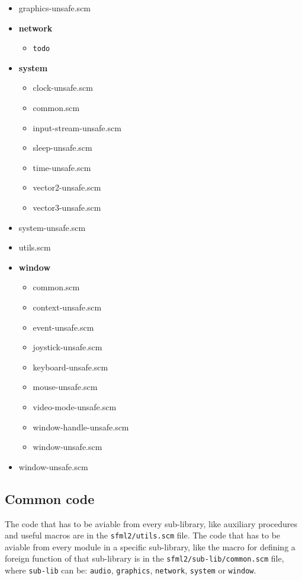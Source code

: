 \documentclass[latterpaper, leqno]{article}
\begin{document}
\begin{itemize}
\begin{itemize}
  \item graphics-unsafe.scm

  \item \textbf{network}
    \begin{itemize}
    \item \texttt{todo}
    \end{itemize}

  \item \textbf{system}
    \begin{itemize}
    \item clock-unsafe.scm
    \item common.scm
    \item input-stream-unsafe.scm
    \item sleep-unsafe.scm
    \item time-unsafe.scm
    \item vector2-unsafe.scm
    \item vector3-unsafe.scm
    \end{itemize}

  \item system-unsafe.scm

  \item utils.scm

  \item \textbf{window}
    \begin{itemize}
    \item common.scm
    \item context-unsafe.scm
    \item event-unsafe.scm
    \item joystick-unsafe.scm
    \item keyboard-unsafe.scm
    \item mouse-unsafe.scm
    \item video-mode-unsafe.scm
    \item window-handle-unsafe.scm
    \item window-unsafe.scm
    \end{itemize}

  \item window-unsafe.scm

  \end{itemize}

\end{itemize}

\subsection*{Common code}
The code that has to be aviable from every sub-library, like auxiliary procedures and useful macros are in the \texttt{sfml2/utils.scm} file. The code that has to be aviable from every module in a specific sub-library, like the macro for defining a foreign function of that sub-library is in the \texttt{sfml2/sub-lib/common.scm} file, where \texttt{sub-lib} can be: \texttt{audio}, \texttt{graphics}, \texttt{network}, \texttt{system} or \texttt{window}.
\end{document}
